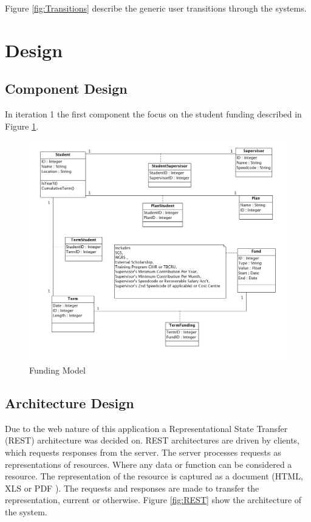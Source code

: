 \documentclass[11pt,a4paper]{report}
\begin{document}
Figure \ref{fig:Transitions} describe the generic user transitions through the systems. 

\section{Design}

\subsection{Component Design}
In iteration 1 the first component the focus on the student funding described in Figure \ref{fig:DataFlow}. 
\begin{figure}[htp]
\centering
\includegraphics[scale=0.25]{diagrams/StudentFunding.png}
\caption{Funding Model}
\label{fig:DataFlow}
\end{figure}
\subsection{Architecture Design} 
Due to the web nature of this application a Representational State Transfer (REST) architecture was decided on. REST architectures are driven by clients, which requests responses from the server.  The server processes requests as representations of resources. Where any data or function can be considered a resource. The representation of the resource is captured as a document (HTML, XLS or PDF ). The requests and responses are made to transfer the representation, current or otherwise. Figure \ref{fig:REST} show the architecture of the system. 
\end{document}
